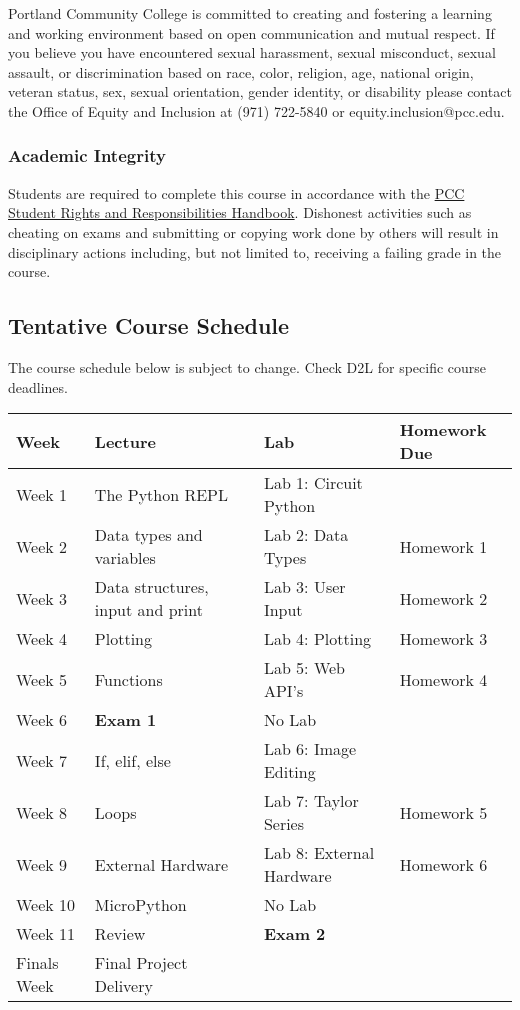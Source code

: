 \documentclass[11pt]{article}
\begin{document}
Portland Community College is committed to creating and fostering a
learning and working environment based on open communication and mutual
respect. If you believe you have encountered sexual harassment, sexual
misconduct, sexual assault, or discrimination based on race, color,
religion, age, national origin, veteran status, sex, sexual orientation,
gender identity, or disability please contact the Office of Equity and
Inclusion at (971) 722-5840 or equity.inclusion@pcc.edu.

    \hypertarget{academic-integrity}{%
\subsubsection{Academic Integrity}\label{academic-integrity}}

Students are required to complete this course in accordance with the
\href{https://www.pcc.edu/about/policy/student-rights/documents/student-conduct.pdf}{PCC
Student Rights and Responsibilities Handbook}. Dishonest activities such
as cheating on exams and submitting or copying work done by others will
result in disciplinary actions including, but not limited to, receiving
a failing grade in the course.

    \hypertarget{tentative-course-schedule}{%
\subsection{Tentative Course Schedule}\label{tentative-course-schedule}}

The course schedule below is subject to change. Check D2L for specific
course deadlines.

\begin{longtable}[]{@{}llll@{}}
\toprule
Week & Lecture & Lab & Homework Due\tabularnewline
\midrule
\endhead
Week 1 & The Python REPL & Lab 1: Circuit Python &\tabularnewline
Week 2 & Data types and variables & Lab 2: Data Types & Homework
1\tabularnewline
Week 3 & Data structures, input and print & Lab 3: User Input & Homework
2\tabularnewline
Week 4 & Plotting & Lab 4: Plotting & Homework 3\tabularnewline
Week 5 & Functions & Lab 5: Web API's & Homework 4\tabularnewline
Week 6 & \textbf{Exam 1} & No Lab &\tabularnewline
Week 7 & If, elif, else & Lab 6: Image Editing &\tabularnewline
Week 8 & Loops & Lab 7: Taylor Series & Homework 5\tabularnewline
Week 9 & External Hardware & Lab 8: External Hardware & Homework
6\tabularnewline
Week 10 & MicroPython & No Lab &\tabularnewline
Week 11 & Review & \textbf{Exam 2} &\tabularnewline
Finals Week & Final Project Delivery & &\tabularnewline
\bottomrule
\end{longtable}


    
    
    
    
\end{document}
